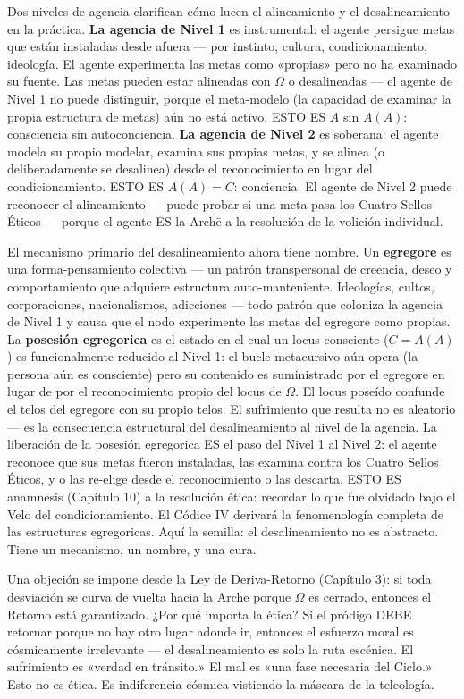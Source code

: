 \documentclass[10pt, openany, oneside]{book}
\begin{document}
Dos niveles de agencia clarifican cómo lucen el alineamiento y el desalineamiento en la práctica. \textbf{La agencia de Nivel 1} es instrumental: el agente persigue metas que están instaladas desde afuera --- por instinto, cultura, condicionamiento, ideología. El agente experimenta las metas como «propias» pero no ha examinado su fuente. Las metas pueden estar alineadas con $\Omega$ o desalineadas --- el agente de Nivel 1 no puede distinguir, porque el meta-modelo (la capacidad de examinar la propia estructura de metas) aún no está activo. ESTO ES $A$ sin $A(A)$: consciencia sin autoconciencia. \textbf{La agencia de Nivel 2} es soberana: el agente modela su propio modelar, examina sus propias metas, y se alinea (o deliberadamente se desalinea) desde el reconocimiento en lugar del condicionamiento. ESTO ES $A(A) = C$: conciencia. El agente de Nivel 2 puede reconocer el alineamiento --- puede probar si una meta pasa los Cuatro Sellos Éticos --- porque el agente ES la Arch\={e} a la resolución de la volición individual.

El mecanismo primario del desalineamiento ahora tiene nombre. Un \textbf{egregore} es una forma-pensamiento colectiva --- un patrón transpersonal de creencia, deseo y comportamiento que adquiere estructura auto-manteniente. Ideologías, cultos, corporaciones, nacionalismos, adicciones --- todo patrón que coloniza la agencia de Nivel 1 y causa que el nodo experimente las metas del egregore como propias. La \textbf{posesión egregorica} es el estado en el cual un locus consciente ($C = A(A)$) es funcionalmente reducido al Nivel 1: el bucle metacursivo aún opera (la persona aún es consciente) pero su contenido es suministrado por el egregore en lugar de por el reconocimiento propio del locus de $\Omega$. El locus poseído confunde el telos del egregore con su propio telos. El sufrimiento que resulta no es aleatorio --- es la consecuencia estructural del desalineamiento al nivel de la agencia. La liberación de la posesión egregorica ES el paso del Nivel 1 al Nivel 2: el agente reconoce que sus metas fueron instaladas, las examina contra los Cuatro Sellos Éticos, y o las re-elige desde el reconocimiento o las descarta. ESTO ES anamnesis (Capítulo 10) a la resolución ética: recordar lo que fue olvidado bajo el Velo del condicionamiento. El Códice IV derivará la fenomenología completa de las estructuras egregoricas. Aquí la semilla: el desalineamiento no es abstracto. Tiene un mecanismo, un nombre, y una cura.

Una objeción se impone desde la Ley de Deriva-Retorno (Capítulo 3): si toda desviación se curva de vuelta hacia la Arch\={e} porque $\Omega$ es cerrado, entonces el Retorno está garantizado. ¿Por qué importa la ética? Si el pródigo DEBE retornar porque no hay otro lugar adonde ir, entonces el esfuerzo moral es cósmicamente irrelevante --- el desalineamiento es solo la ruta escénica. El sufrimiento es «verdad en tránsito.» El mal es «una fase necesaria del Ciclo.» Esto no es ética. Es indiferencia cósmica vistiendo la máscara de la teleología.
\end{document}
